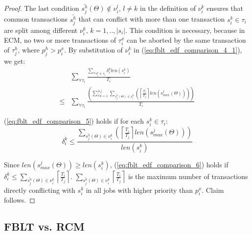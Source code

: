 \documentclass[a4paper,english]{article}
\newtheorem{proof}{Proof}
\begin{document}
\begin{proof}
The last condition $\bar{s_{j}^{h}}(\Theta)\not\in\nu_{i}^{l},\, l\ne k$
in the definition of $\nu_{i}^{k}$ ensures that common transactions $\bar{s_{j}^{h}}$
that can conflict with more than one transaction $s_{i}^{k}\in\tau_{i}$
are split among different $\nu_{i}^{k},\, k=1,..,|s_{i}|$. This
condition is necessary, because in ECM, no two or more transactions
of $\tau_{i}^{x}$ can be aborted by the same transaction of $\tau_{j}^{h}$, 
where $p_{j}^{h}>p_{i}^{x}$. By substitution of $\nu_{i}^{k}$ in
(\ref{eq:fblt_edf_comparison_4_1}), we get:
\begin{eqnarray}
 & \sum_{\forall\tau_{i}}\frac{\sum_{\forall s_{i}^{k}\in s_{i}}\delta_i^klen(s_{i}^{k})}{T_{i}}\label{eq:fblt_edf_comparison_5}\\
\le & \sum_{\forall\tau_{i}}\frac{\left(\sum_{\forall k=1}^{|s_{i}|}\sum_{\bar{s_{j}^{h}}(\Theta)\in\nu_{i}^{k}}\left(\left\lceil \frac{T_{i}}{T_{j}}\right\rceil len\left(s_{max}^{j}(\Theta)\right)\right)\right)}{T_{i}}\nonumber 
\end{eqnarray}

(\ref{eq:fblt_edf_comparison_5}) holds if for each $s_{i}^{k}\in\tau_{i}$:
\begin{equation}
\delta_{i}^{k}\le\frac{\sum_{\bar{s_{j}^{h}}(\Theta)\in\nu_{i}^{k}}\left(\left\lceil \frac{T_{i}}{T_{j}}\right\rceil len\left(s_{max}^{j}(\Theta)\right)\right)}{len(s_{i}^{k})}\label{eq:fblt_edf_comparison_6}
\end{equation}

Since $len\left(s_{max}^{j}(\Theta)\right)\ge len(s_{i}^{k})$, (\ref{eq:fblt_edf_comparison_6}) holds if $\delta_{i}^{k}\le \sum_{\bar{s_{j}^{h}}(\Theta)\in\nu_{i}^{k}}\left\lceil \frac{T_{i}}{T_{j}}\right\rceil$. $\sum_{\bar{s_{j}^{h}}(\Theta)\in\nu_{i}^{k}}\left\lceil \frac{T_{i}}{T_{j}}\right\rceil$
is the maximum number of transactions directly conflicting with $s_i^k$ in all jobs with higher priority than $p_{i}^x$. Claim follows.
\end{proof}

\subsection{FBLT vs. RCM}
\end{document}
